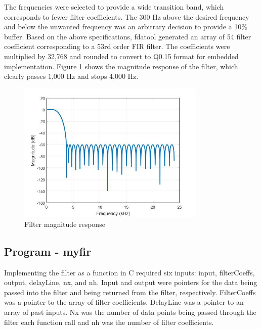\documentclass[11pt,pdftex,portrait,letterpaper]{article}
\begin{document}
The frequencies were selected to provide a wide transition band, which corresponds to fewer filter coefficients. The 300 Hz above the desired frequency and below the unwanted frequency was an arbitrary decision to provide a 10\% buffer. Based on the above specifications, fdatool generated an array of 54 filter coefficient corresponding to a 53rd order FIR filter. The coefficients were multiplied by 32,768 and rounded to convert to Q0.15 format for embedded implementation. Figure \ref{f:fig1} shows the magnitude response of the filter, which clearly passes 1,000 Hz and stops 4,000 Hz.

\begin{figure}[h]
\centering
\includegraphics[width=0.8\textwidth]{./img1}
\caption{Filter magnitude response}
\label{f:fig1}
\end{figure}

\subsection{Program - myfir}

Implementing the filter as a function in C required six inputs: input, filterCoeffs, output, delayLine, nx, and nh. Input and output were pointers for the data being passed into the filter and being returned from the filter, respectively. FilterCoeffs was a pointer to the array of filter coefficients. DelayLine was a pointer to an array of past inputs. Nx was the number of data points being passed through the filter each function call and nh was the number of filter coefficients.
\end{document}
